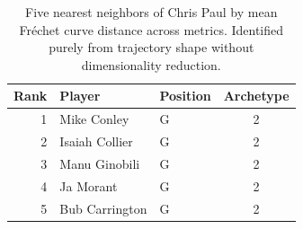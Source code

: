 \begin{table}[htbp]
  \centering\small
  \begin{tabular}{rllc}
    \toprule
    Rank & Player & Position & Archetype \\
    \midrule
    1 & Mike Conley & G & 2 \\
    2 & Isaiah Collier & G & 2 \\
    3 & Manu Ginobili & G & 2 \\
    4 & Ja Morant & G & 2 \\
    5 & Bub Carrington & G & 2 \\
    \bottomrule
  \end{tabular}
  \caption{Five nearest neighbors of Chris Paul by mean Fr\'{e}chet curve distance across metrics. Identified purely from trajectory shape without dimensionality reduction.}
  \label{tab:Chris_Paul_frechet_curve_neighbors}
\end{table}


